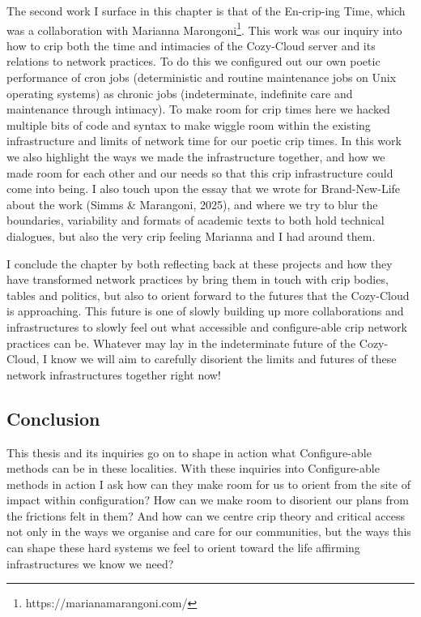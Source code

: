 The second work I surface in this chapter is that of the En-crip-ing
Time, which was a collaboration with Marianna Marongoni\footnote{https://marianamarangoni.com/}.
This work was our inquiry into how to crip both the time and intimacies
of the Cozy-Cloud server and its relations to network practices. To do
this we configured out our own poetic performance of cron jobs
(deterministic and routine maintenance jobs on Unix operating systems)
as chronic jobs (indeterminate, indefinite care and maintenance through
intimacy). To make room for crip times here we hacked multiple bits of
code and syntax to make wiggle room within the existing infrastructure
and limits of network time for our poetic crip times. In this work we
also highlight the ways we made the infrastructure together, and how we
made room for each other and our needs so that this crip infrastructure
could come into being. I also touch upon the essay that we wrote for
Brand-New-Life about the work (Simms \& Marangoni, 2025), and where we
try to blur the boundaries, variability and formats of academic texts to
both hold technical dialogues, but also the very crip feeling Marianna
and I had around them.

I conclude the chapter by both reflecting back at these projects and how
they have transformed network practices by bring them in touch with crip
bodies, tables and politics, but also to orient forward to the futures
that the Cozy-Cloud is approaching. This future is one of slowly
building up more collaborations and infrastructures to slowly feel out
what accessible and configure-able crip network practices can be.
Whatever may lay in the indeterminate future of the Cozy-Cloud, I know
we will aim to carefully disorient the limits and futures of these
network infrastructures together right now!

\hypertarget{conclusion}{%
\subsection[Conclusion]{\texorpdfstring{\protect\hypertarget{anchor}{}{}Conclusion}{Conclusion}}\label{conclusion}}

This thesis and its inquiries go on to shape in action what
Configure-able methods can be in these localities. With these inquiries
into Configure-able methods in action I ask how can they make room for
us to orient from the site of impact within configuration? How can we
make room to disorient our plans from the frictions felt in them? And
how can we centre crip theory and critical access not only in the ways
we organise and care for our communities, but the ways this can shape
these hard systems we feel to orient toward the life affirming
infrastructures we know we need?
